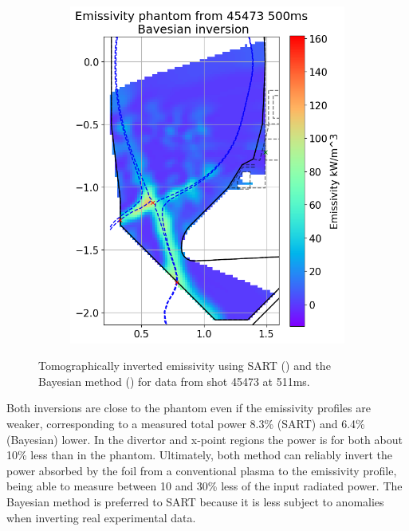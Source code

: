 \begin{figure}
\begin{subfigure}{0.45\linewidth}
         \includegraphics[trim={0 0 0 43},clip,width=\textwidth]{Chapters/chapter2/figs/inversion_comparison_emissivity_pantom_test-Bayes.png}
         \caption{}
         \label{fig:self_phantom1b}
     \end{subfigure}
    \caption{Tomographically inverted emissivity using SART () and the Bayesian method () for data from shot 45473 at 511ms.}
    \label{fig:self_phantom1}
\end{figure}

Both inversions are close to the phantom even if the emissivity profiles are weaker, corresponding to a measured total power 8.3\% (SART) and 6.4\% (Bayesian) lower. In the divertor and x-point regions the power is for both about 10\% less than in the phantom.
Ultimately, both method can reliably invert the power absorbed by the foil from a conventional plasma to the emissivity profile, being able to measure between 10 and 30\% less of the input radiated power. The Bayesian method is preferred to SART because it is less subject to anomalies when inverting real experimental data.

